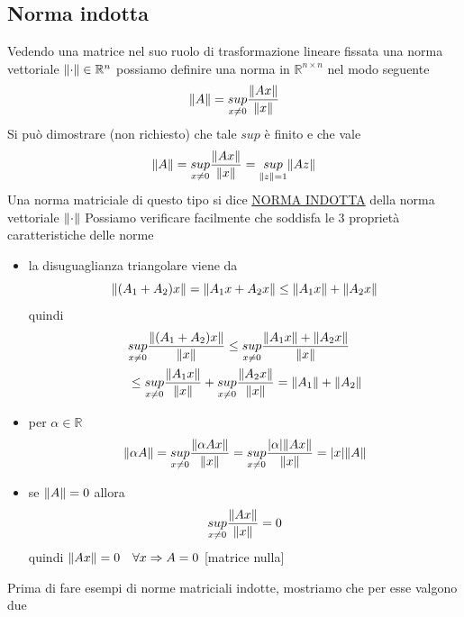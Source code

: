 \documentclass[12pt,a4paper]{article}
\DeclarePairedDelimiter{\abs}{\lvert}{\rvert}
\DeclarePairedDelimiter{\norma}{\lVert}{\rVert}
\begin{document}
\subsection{Norma indotta}
Vedendo una matrice nel suo ruolo di trasformazione lineare fissata una norma vettoriale $\norma{\cdot}
\in \mathbb{R}^n$ possiamo definire una norma in $\mathbb{R}^{n\times n}$ nel modo seguente 
\begin{equation*}
    \norma{A}=\underset{x\neq0}{sup}\frac{\norma{Ax}}{\norma{x}}
\end{equation*}
Si può dimostrare (non richiesto) che tale $sup$ è finito e che vale
\begin{equation*}
    \norma{A}=\underset{x\neq0}{sup}\frac{\norma{Ax}}{\norma{x}}=\underset{\norma{z}=1}{sup}\norma{Az}
\end{equation*}
Una norma matriciale di questo tipo si dice \uline{NORMA INDOTTA} della norma vettoriale $\norma{\cdot}$
Possiamo verificare facilmente che soddisfa le 3 proprietà
caratteristiche delle norme
\begin{itemize}
    \item la disuguaglianza triangolare viene da
    \[
    \norma{(A_1 + A_2)x} = \norma{A_1x + A_2x} \le \norma{A_1x} + \norma{A_2x}
    \]
    quindi
    \[
    \begin{split}
        & \underset{x \neq 0}{sup} \frac{\norma{(A_1 + A_2)x}}{\norma{x}} \le \underset{x \neq 0}{sup} \frac{\norma{A_1x} + \norma{A_2x}}{\norma{x}} \\
        & \le \underset{x \neq 0}{sup} \frac{\norma{A_1x}}{\norma{x}} + \underset{x \neq 0}{sup} \frac{\norma{A_2x}}{\norma{x}} = \norma{A_1} + \norma{A_2}
    \end{split}
    \]
    
    \item per $\alpha \in \mathbb{R}$
    \[
    \norma{\alpha A} = \underset{x \neq 0}{sup} \frac{\norma{\alpha Ax}}{\norma{x}}
    = \underset{x \neq 0}{sup} \frac{\abs{\alpha} \norma{Ax}}{\norma{x}} = \abs{x} \norma{A}
    \]
    
    \item se $\norma{A} = 0$ allora \[\underset{x \neq 0}{sup} \frac{\norma{Ax}}{\norma{x}} = 0\]
    quindi $\norma{Ax} = 0 \quad \forall x \Rightarrow A = 0$ [matrice nulla]
\end{itemize}
Prima di fare esempi di norme matriciali indotte, mostriamo che per esse valgono due
\end{document}
